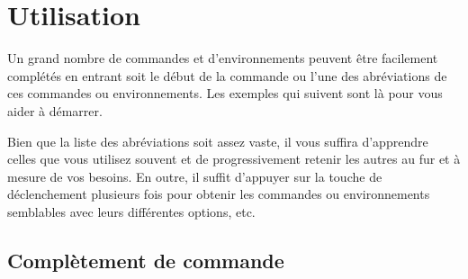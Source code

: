 \documentclass[11pt,french]{article}
\newcommand{\ctlkey}{\texttt{Ctl}}
\newcommand{\cmdkey}{\texttt{Cmd}}
\newcommand{\esckey}{\texttt{Esc}}
\newcommand{\mnu}[1]{\texttt{#1}}
\newcommand{\cmd}[1]{\texttt{#1}}
\newcommand{\To}{\,\(\to\)\,}
\newcommand{\selmark}{\colorbox{green}{\rule[-0.5ex]{0ex}{2.1ex}\texttt{•}}}
\newcommand{\TS}{\textsf{\TeX Shop}}
\begin{document}
\section*{Utilisation}

Un grand nombre de commandes et d'environnements peuvent être facilement complétés en entrant soit le début de la commande ou l'une des abréviations de ces commandes ou environnements. Les exemples qui suivent sont là pour vous aider à démarrer.

Bien que la liste des abréviations soit assez vaste, il vous suffira d'apprendre celles que vous utilisez souvent et de progressivement retenir les autres au fur et à mesure de vos besoins. En outre, il suffit d'appuyer sur la touche de déclenchement plusieurs fois pour obtenir les commandes ou environnements semblables avec leurs différentes options, etc. 

%

\subsection*{Complètement de commande}

%
\end{document}
